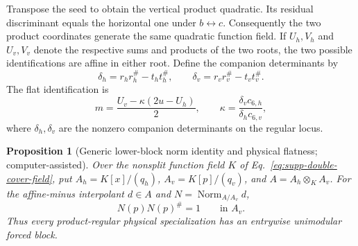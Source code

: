\documentclass[aps,prx,reprint,nofootinbib,twoside,superscriptaddress,longbibliography,floatfix]{revtex4-2}
\newtheorem{proposition}[theorem]{Proposition}
\theoremstyle{definition}
\begin{document}
Transpose the seed to obtain the vertical product quadratic.  Its residual discriminant equals the horizontal one under $b\leftrightarrow c$. Consequently the two product coordinates generate the same quadratic function field.  If $U_h,V_h$ and $U_v,V_v$ denote the respective sums and products of the two roots, the two possible identifications are affine in either root.  Define the companion determinants by
\begin{equation}
\delta_h=r_hr_h^\#-t_ht_h^\#,
\qquad
\delta_v=r_vr_v^\#-t_vt_v^\#.
\label{eq:supp-companion-determinants}
\end{equation}
The flat identification is
\begin{equation}
m=\frac{U_v-\kappa(2u-U_h)}{2},\qquad
\kappa=\frac{\delta_vc_{6,h}}{\delta_hc_{6,v}},
\label{eq:supp-minus-matching}
\end{equation}
where $\delta_h,\delta_v$ are the nonzero companion determinants on the regular locus.


\begin{proposition}[{Generic lower-block norm identity and physical flatness; computer-assisted}]
\label{prop:supp-generic-flatness}
{Over the nonsplit function field $K$ of Eq.~\eqref{eq:supp-double-cover-field}, put $A_h=K[x]/(q_h)$, $A_v=K[p]/(q_v)$, and $A=A_h\otimes_KA_v$.  For the affine-minus interpolant $d\in A$ and $N=\operatorname{Norm}_{A/A_v}d$,}
\begin{equation}
{N(p)N(p)^\#=1\qquad\text{in }A_v.}
\label{eq:supp-flatness-cubic-norm-identity}
\end{equation}
{Thus every product-regular physical specialization has an entrywise unimodular forced block.}
\end{proposition}
\end{document}
